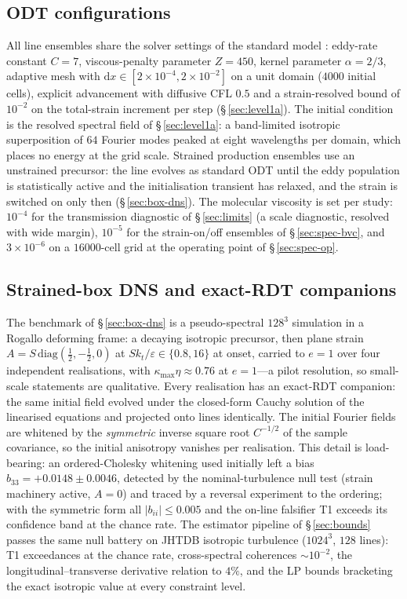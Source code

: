 \documentclass[11pt,a4paper]{article}
\begin{document}
\subsection{ODT configurations}

All line ensembles share the solver settings of the standard model
\citep{StephensLignell2021}: eddy-rate constant $C=7$, viscous-penalty
parameter $Z=450$, kernel parameter $\alpha=2/3$, adaptive mesh with
$\mathrm{d}x\in[2\times10^{-4},2\times10^{-2}]$ on a unit domain
($4000$ initial cells), explicit advancement with diffusive CFL $0.5$
and a strain-resolved bound of $10^{-2}$ on the total-strain increment
per step (\S\,\ref{sec:level1a}). The initial condition is the resolved
spectral field of \S\,\ref{sec:level1a}: a band-limited isotropic
superposition of $64$ Fourier modes peaked at eight wavelengths per
domain, which places no energy at the grid scale. Strained production
ensembles use an unstrained precursor: the line evolves as standard ODT
until the eddy population is statistically active and the initialisation
transient has relaxed, and the strain is switched on only then
(\S\,\ref{sec:box-dns}). The molecular viscosity is set per study:
$10^{-4}$ for the transmission diagnostic of \S\,\ref{sec:limits}
(a scale diagnostic, resolved with wide margin), $10^{-5}$ for the
strain-on/off ensembles of \S\,\ref{sec:spec-bvc}, and
$3\times10^{-6}$ on a $16000$-cell grid at the operating point of
\S\,\ref{sec:spec-op}.

\subsection{Strained-box DNS and exact-RDT companions}

The benchmark of \S\,\ref{sec:box-dns} is a pseudo-spectral $128^3$
simulation in a Rogallo deforming frame: a decaying isotropic precursor,
then plane strain $A=S\,\mathrm{diag}(\tfrac12,-\tfrac12,0)$ at
$Sk_t/\varepsilon\in\{0.8,16\}$ at onset, carried to $e=1$ over four
independent realisations, with $\kappa_{\max}\eta\approx0.76$ at
$e=1$---a pilot resolution, so small-scale statements are qualitative.
Every realisation has an exact-RDT companion: the same initial field
evolved under the closed-form Cauchy solution of the linearised
equations and projected onto lines identically. The initial Fourier
fields are whitened by the \emph{symmetric} inverse square root
$C^{-1/2}$ of the sample covariance, so the initial anisotropy vanishes
per realisation. This detail is load-bearing: an ordered-Cholesky
whitening used initially left a bias $b_{33}=+0.0148\pm0.0046$,
detected by the nominal-turbulence null test (strain machinery active,
$A=0$) and traced by a reversal experiment to the ordering; with the
symmetric form all $|b_{ii}|\le0.005$ and the on-line falsifier T1
exceeds its confidence band at the chance rate. The estimator pipeline
of \S\,\ref{sec:bounds} passes the same null battery on JHTDB isotropic
turbulence ($1024^3$, $128$ lines): T1 exceedances at the chance rate,
cross-spectral coherences $\sim10^{-2}$, the longitudinal--transverse
derivative relation to $4\%$, and the LP bounds bracketing the exact
isotropic value at every constraint level.
\end{document}
